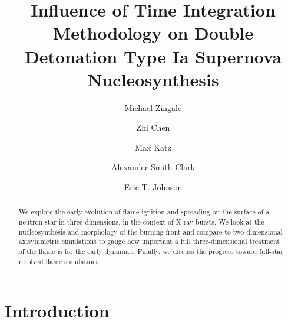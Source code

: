 \documentclass[linenumbers,trackchanges]{aastex631}
\begin{document}
\title{Influence of Time Integration Methodology on Double Detonation Type
Ia Supernova Nucleosynthesis}


\author[0000-0001-8401-030X]{Michael Zingale}

\author[0000-0002-2839-107X]{Zhi Chen}


\author[0000-0003-0439-4556]{Max Katz}


\author[0000-0001-5961-1680]{Alexander Smith Clark}

\author[0000-0003-3603-6868]{Eric T. Johnson}



\begin{abstract}
We explore the early evolution of flame ignition and spreading on the
surface of a neutron star in three-dimensions, in the context of X-ray
bursts.  We look at the nucleosynthesis and morphology of the burning
front and compare to two-dimensional axisymmetric simulations to gauge
how important a full three-dimensional treatment of the flame is for
the early dynamics.  Finally, we discuss the progress toward full-star
resolved flame simulations.\end{abstract}


\section{Introduction}\label{Sec:Introduction}
\end{document}
